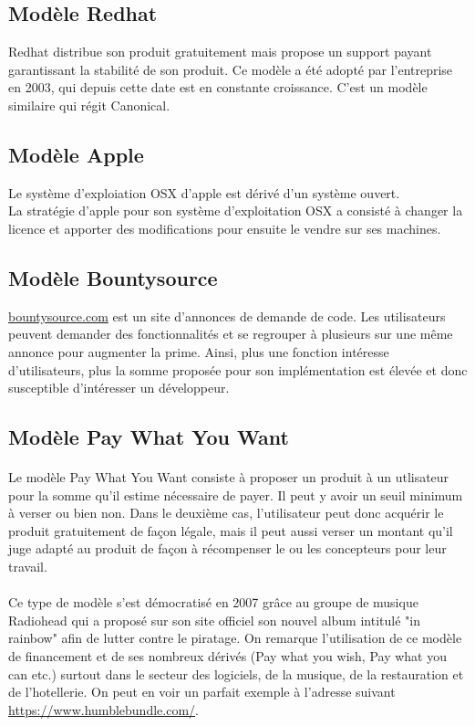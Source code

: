     \subsection{Modèle Redhat}

Redhat distribue son produit gratuitement mais propose un support payant
garantissant la stabilité de son produit. Ce modèle a été adopté par
l'entreprise en 2003, qui depuis cette date est en constante croissance.
C'est un modèle similaire qui régit Canonical.

    \subsection{Modèle Apple}

Le système d'exploiation OSX d'apple est dérivé d'un système ouvert.\\
La stratégie d'apple pour son système d'exploitation OSX a consisté à changer la
licence et apporter des modifications pour ensuite le vendre sur ses machines.

    \subsection{Modèle Bountysource}

\url{bountysource.com} est un site d'annonces de demande de code. Les
utilisateurs peuvent demander des fonctionnalités et se regrouper à plusieurs
sur une même annonce pour augmenter la prime. Ainsi, plus une fonction intéresse
d'utilisateurs, plus la somme proposée pour son implémentation est élevée et
donc susceptible d'intéresser un développeur.

    \subsection{Modèle Pay What You Want}
    
    \paragraph{}
    Le modèle Pay What You Want consiste à proposer un produit à un utlisateur pour la somme qu'il estime nécessaire de payer. Il peut y avoir un seuil minimum à verser ou bien non. Dans le deuxième cas, l'utilisateur peut donc acquérir le produit gratuitement de façon légale, mais il peut aussi verser un montant qu'il juge adapté au produit de façon à récompenser le ou les concepteurs pour leur travail.
    \paragraph{}
    Ce type de modèle s'est démocratisé en 2007 grâce au groupe de musique Radiohead qui a proposé sur son site officiel son nouvel album intitulé "in rainbow" afin de lutter contre le piratage. On remarque l'utilisation de ce modèle de financement et de ses nombreux dérivés (Pay what you wish, Pay what you can etc.) surtout dans le secteur des logiciels, de la musique, de la restauration et de l'hotellerie. On peut en voir un parfait exemple à l'adresse suivant \url{https://www.humblebundle.com/}.


